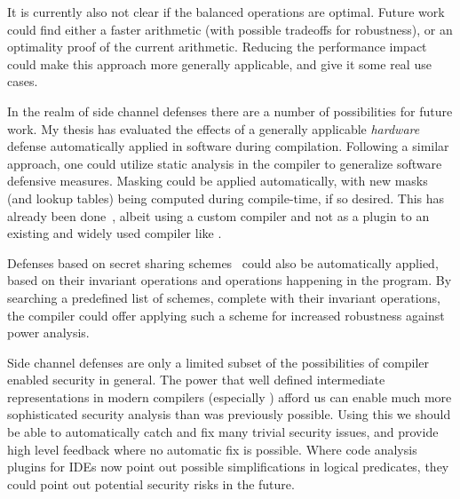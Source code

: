 It is currently also not clear if the balanced operations are optimal.
Future work could find either a faster arithmetic (with possible tradeoffs for robustness), or an optimality proof of the current arithmetic.
Reducing the performance impact could make this approach more generally applicable, and give it some real use cases.

In the realm of side channel defenses there are a number of possibilities for future work.
My thesis has evaluated the effects of a generally applicable \emph{hardware} defense automatically applied in software during compilation.
Following a similar approach, one could utilize static analysis in the compiler to generalize software defensive measures.
Masking could be applied automatically, with new masks (and lookup tables) being computed during compile-time, if so desired.
This has already been done~\cite{moss2012compiler}, albeit using a custom compiler and not as a plugin to an existing and widely used compiler like \llvm{}.

Defenses based on secret sharing schemes~\cite{goubin2011protecting} could also be automatically applied, based on their invariant operations and operations happening in the program.
By searching a predefined list of schemes, complete with their invariant operations, the compiler could offer applying such a scheme for increased robustness against power analysis.

Side channel defenses are only a limited subset of the possibilities of compiler enabled security in general.
The power that well defined intermediate representations in modern compilers (especially \ir{}) afford us can enable much more sophisticated security analysis than was previously possible.
Using this we should be able to automatically catch and fix many trivial security issues, and provide high level feedback where no automatic fix is possible.
Where code analysis plugins for IDEs now point out possible simplifications in logical predicates, they could point out potential security risks in the future.
